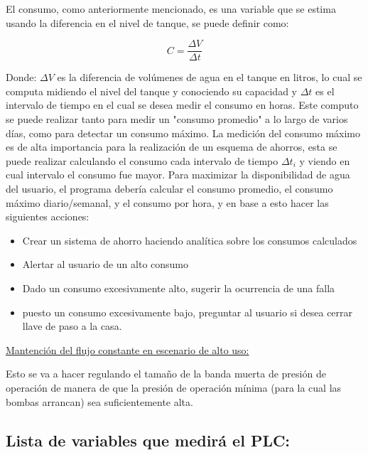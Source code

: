 \documentclass[12pt]{article}
\begin{document}
	\vspace{5mm}
	
	El consumo, como anteriormente mencionado, es una variable que se estima usando la diferencia en el nivel de tanque, se puede definir como:
	
	$$ C = \frac{\Delta V}{\Delta t} $$
	
	Donde: $\Delta V$ es la diferencia de volúmenes de agua en el tanque en litros, lo cual se computa midiendo el nivel del tanque y conociendo su capacidad y $\Delta t$ es el intervalo de tiempo en el cual se desea medir el consumo en horas.
	Este computo se puede realizar tanto para medir un "consumo promedio" a lo largo de varios días, como para detectar un consumo máximo.
	La medición del consumo máximo es de alta importancia para la realización de un esquema de ahorros, esta se puede realizar calculando el consumo cada intervalo de tiempo $\Delta t_i$ y viendo en cual intervalo el consumo fue mayor.
	Para maximizar la disponibilidad de agua del usuario, el programa debería calcular el consumo promedio, el consumo máximo diario/semanal, y el consumo por hora, y en base a esto hacer las siguientes acciones:
	
	\begin{itemize}
		\item Crear un sistema de ahorro haciendo analítica sobre los consumos calculados
		\item Alertar al usuario de un alto consumo
		\item Dado un consumo excesivamente alto, sugerir la ocurrencia de una falla
		\item puesto un consumo excesivamente bajo, preguntar al usuario si desea cerrar llave de paso a la casa.
	\end{itemize}
	
	\vspace{5mm}
	
	\underline{Mantención del flujo constante en escenario de alto uso:}
	
	\vspace{5mm}
	
	Esto se va a hacer regulando el tamaño de la banda muerta de presión de operación de manera de que la presión de operación mínima (para la cual las bombas arrancan) sea suficientemente alta.
	
	\subsection{Lista de variables que medirá el PLC:}
	
\end{document}
